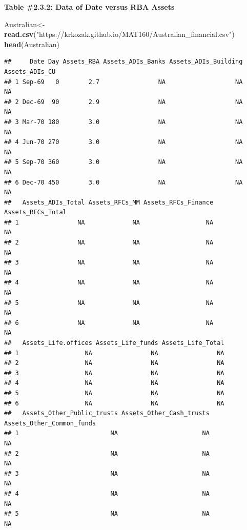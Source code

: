 \documentclass[
]{book}
\newenvironment{Shaded}{\begin{snugshade}}{\end{snugshade}}
\newcommand{\KeywordTok}[1]{\textcolor[rgb]{0.13,0.29,0.53}{\textbf{#1}}}
\newcommand{\NormalTok}[1]{#1}
\newcommand{\StringTok}[1]{\textcolor[rgb]{0.31,0.60,0.02}{#1}}
\begin{document}
\textbf{Table \#2.3.2: Data of Date versus RBA Assets}

\begin{Shaded}
\begin{Highlighting}[]
\NormalTok{Australian<-}\StringTok{ }\KeywordTok{read.csv}\NormalTok{(}\StringTok{"https://krkozak.github.io/MAT160/Australian_financial.csv"}\NormalTok{)}
\KeywordTok{head}\NormalTok{(Australian)}
\end{Highlighting}
\end{Shaded}

\begin{verbatim}
##     Date Day Assets_RBA Assets_ADIs_Banks Assets_ADIs_Building Assets_ADIs_CU
## 1 Sep-69   0        2.7                NA                   NA             NA
## 2 Dec-69  90        2.9                NA                   NA             NA
## 3 Mar-70 180        3.0                NA                   NA             NA
## 4 Jun-70 270        3.0                NA                   NA             NA
## 5 Sep-70 360        3.0                NA                   NA             NA
## 6 Dec-70 450        3.0                NA                   NA             NA
##   Assets_ADIs_Total Assets_RFCs_MM Assets_RFCs_Finance Assets_RFCs_Total
## 1                NA             NA                  NA                NA
## 2                NA             NA                  NA                NA
## 3                NA             NA                  NA                NA
## 4                NA             NA                  NA                NA
## 5                NA             NA                  NA                NA
## 6                NA             NA                  NA                NA
##   Assets_Life.offices Assets_Life_funds Assets_Life_Total
## 1                  NA                NA                NA
## 2                  NA                NA                NA
## 3                  NA                NA                NA
## 4                  NA                NA                NA
## 5                  NA                NA                NA
## 6                  NA                NA                NA
##   Assets_Other_Public_trusts Assets_Other_Cash_trusts Assets_Other_Common_funds
## 1                         NA                       NA                        NA
## 2                         NA                       NA                        NA
## 3                         NA                       NA                        NA
## 4                         NA                       NA                        NA
## 5                         NA                       NA                        NA

\end{verbatim}
\end{document}
